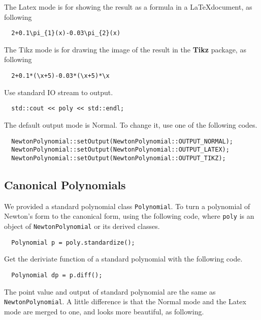 \documentclass[11pt,en]{elegantpaper}
\begin{document}
The Latex mode is for showing the result as a formula in a \LaTeX document, as following

\begin{lstlisting}
  2+0.1\pi_{1}(x)-0.03\pi_{2}(x)
\end{lstlisting}

The Tikz mode is for drawing the image of the result in the \textbf{Tikz} package, as following

\begin{lstlisting}
  2+0.1*(\x+5)-0.03*(\x+5)*\x
\end{lstlisting}

Use standard IO stream to output.

\begin{lstlisting}
  std::cout << poly << std::endl;
\end{lstlisting}

The default output mode is Normal. To change it, use one of the following codes.

\begin{lstlisting}
  NewtonPolynomial::setOutput(NewtonPolynomial::OUTPUT_NORMAL);
  NewtonPolynomial::setOutput(NewtonPolynomial::OUTPUT_LATEX);
  NewtonPolynomial::setOutput(NewtonPolynomial::OUTPUT_TIKZ);
\end{lstlisting}

\subsection{Canonical Polynomials}

We provided a standard polynomial class \verb|Polynomial|. To turn a polynomial of Newton's form to the canonical form, using the following code, where \verb|poly| is an object of \verb|NewtonPolynomial| or its derived classes.

\begin{lstlisting}
  Polynomial p = poly.standardize();
\end{lstlisting}

Get the deriviate function of a standard polynomial with the following code.

\begin{lstlisting}
  Polynomial dp = p.diff();
\end{lstlisting}

The point value and output of standard polynomial are the same as \verb|NewtonPolynomial|. A little difference is that the Normal mode and the Latex mode are merged to one, and looks more beautiful, as following.
\end{document}
